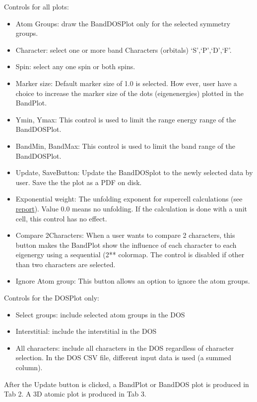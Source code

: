 \documentclass[]{article}
\providecommand{\tightlist}{%
  \setlength{\itemsep}{0pt}\setlength{\parskip}{0pt}}
\begin{document}
Controls for all plots:

\begin{itemize}
\tightlist
\item
  Atom Groups: draw the BandDOSPlot only for the selected symmetry
  groups.
\item
  Character: select one or more band Characters (orbitals)
  `S',`P',`D',`F'.
\item
  Spin: select any one spin or both spins.
\item
  Marker size: Default marker size of 1.0 is selected. How ever, user
  have a choice to increase the marker size of the dots (eigenenergies)
  plotted in the BandPlot.
\item
  Ymin, Ymax: This control is used to limit the range energy range of
  the BandDOSPlot.
\item
  BandMin, BandMax: This control is used to limit the band range of the
  BandDOSPlot.
\item
  Update, SaveButton: Update the BandDOSplot to the newly selected data
  by user. Save the the plot as a PDF on disk.
\item
  Exponential weight: The unfolding exponent for supercell calculations
  (see \href{./doc/report.pdf}{report}). Value 0.0 means no unfolding.
  If the calculation is done with a unit cell, this control has no
  effect.
\item
  Compare 2Characters: When a user wants to compare 2 characters, this
  button makes the BandPlot show the influence of each character to each
  eigenergy using a sequential (2** colormap. The control is disabled if
  other than two characters are selected.
\item
  Ignore Atom group: This button allows an option to ignore the atom
  groups.
\end{itemize}

Controls for the DOSPlot only:

\begin{itemize}
\tightlist
\item
  Select groups: include selected atom groups in the DOS
\item
  Interstitial: include the interstitial in the DOS
\item
  All characters: include all characters in the DOS regardless of
  character selection. In the DOS CSV file, different input data is used
  (a summed column).
\end{itemize}

After the Update button is clicked, a BandPlot or BandDOS plot is
produced in Tab 2. A 3D atomic plot is produced in Tab 3.
\end{document}
